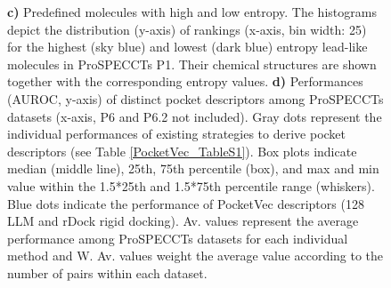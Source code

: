 \begin{figure}[htbp]
{    \textbf{c)} Predefined molecules with high and low entropy. The histograms depict the distribution (y-axis) of rankings (x-axis, bin width: 25) for the highest (sky blue) and lowest (dark blue) entropy lead-like molecules in ProSPECCTs P1. Their chemical structures are shown together with the corresponding entropy values.
    \textbf{d)} Performances (AUROC, y-axis) of distinct pocket descriptors among ProSPECCTs datasets (x-axis, P6 and P6.2 not included). Gray dots represent the individual performances of existing strategies to derive pocket descriptors (see Table \ref{PocketVec_TableS1}). Box plots indicate median (middle line), 25th, 75th percentile (box), and max and min value within the 1.5*25th and 1.5*75th percentile range (whiskers). Blue dots indicate the performance of PocketVec descriptors (128 LLM and rDock rigid docking). Av. values represent the average performance among ProSPECCTs datasets for each individual method and W. Av. values weight the average value according to the number of pairs within each dataset.
  }
  \label{PocketVec_Fig1}
\end{figure}
